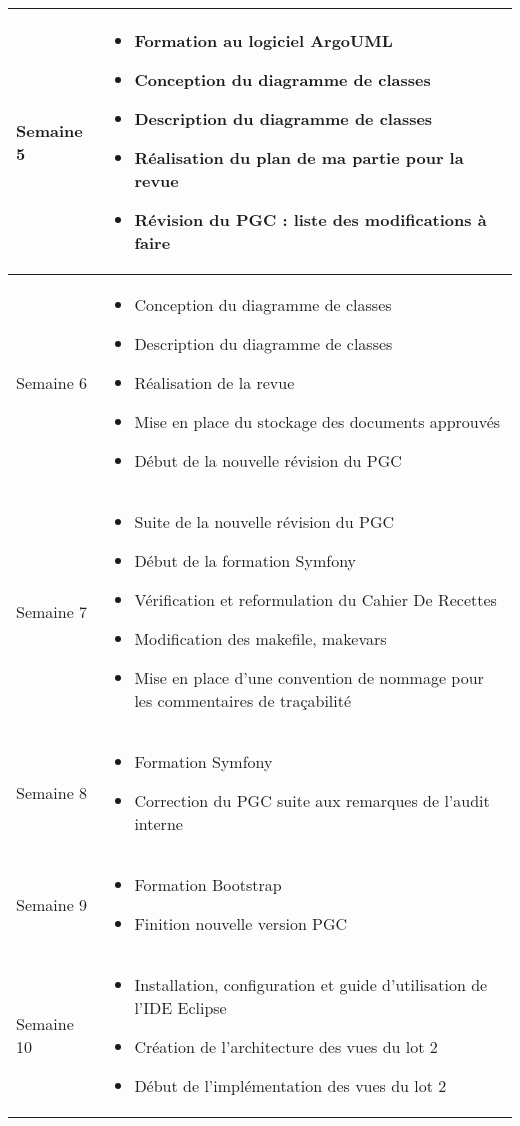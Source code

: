 \documentclass [a4paper] {article}
\begin{document}
\section*{\Mathieu}

\begin{tabularx}{16.8cm}{|>{\columncolor{gray!40}}l|X|}
	\hline
	Semaine 5 & 
	\begin{itemize}
		\item Formation au logiciel ArgoUML
		\item Conception du diagramme de classes
		\item Description du diagramme de classes
		\item Réalisation du plan de ma partie pour la revue
		\item Révision du PGC : liste des modifications à faire
	\end{itemize} \\
	\hline
	Semaine 6 & 
	\begin{itemize}
		\item Conception du diagramme de classes
		\item Description du diagramme de classes
		\item Réalisation de la revue
		\item Mise en place du stockage des documents approuvés
		\item Début de la nouvelle révision du PGC
	\end{itemize} \\
	\hline
	Semaine 7 & 
	\begin{itemize}
		\item Suite de la nouvelle révision du PGC
		\item Début de la formation Symfony
		\item Vérification et reformulation du Cahier De Recettes
		\item Modification des makefile, makevars
		\item Mise en place d'une convention de nommage pour les commentaires de traçabilité
	\end{itemize} \\
	\hline	
	Semaine 8 & 
	\begin{itemize}
		\item Formation Symfony
		\item Correction du PGC suite aux remarques de l'audit interne
	\end{itemize} \\
	\hline
	Semaine 9 & 
	\begin{itemize}
		\item Formation Bootstrap
		\item Finition nouvelle version PGC
	\end{itemize} \\
	\hline
	Semaine 10 & 
	\begin{itemize}
		\item Installation, configuration et guide d'utilisation de l'IDE Eclipse
		\item Création de l'architecture des vues du lot 2
		\item Début de l'implémentation des vues	du lot 2		
	\end{itemize} \\
	\hline	
\end{tabularx}
\end{document}
